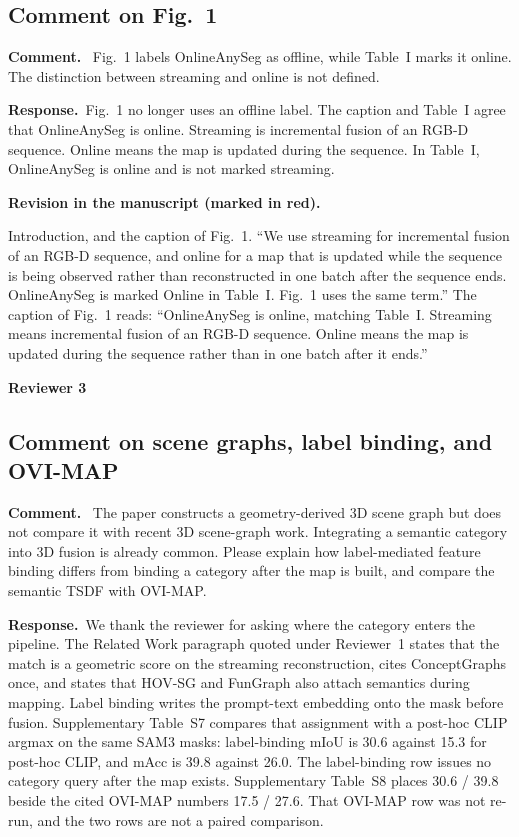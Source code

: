 \documentclass[11pt]{article}
\newcommand{\revcomment}[1]{%
  \par\vspace{0.6em}\noindent\textcolor{revblue}{\textbf{Comment.}}\ %
  \textcolor{revblue}{#1}\par\vspace{0.4em}}
\newcommand{\revresponse}[1]{%
  \par\noindent\textbf{Response.}\ #1\par\vspace{0.3em}}
\newcommand{\revchange}[1]{%
  \par\noindent\textbf{Revision in the manuscript (marked in red).}\par
  \noindent\textcolor{revred}{#1}\par\vspace{0.8em}}
\begin{document}
\subsection*{Comment on Fig.~1}

\revcomment{Fig.~1 labels OnlineAnySeg as offline, while Table~I marks it online. The distinction between streaming and online is not defined.}

\revresponse{Fig.~1 no longer uses an offline label. The caption and Table~I agree that OnlineAnySeg is online. Streaming is incremental fusion of an RGB-D sequence. Online means the map is updated during the sequence. In Table~I, OnlineAnySeg is online and is not marked streaming.}

\revchange{Introduction, and the caption of Fig.~1. ``We use streaming for incremental fusion of an RGB-D sequence, and online for a map that is updated while the sequence is being observed rather than reconstructed in one batch after the sequence ends. OnlineAnySeg is marked Online in Table~I. Fig.~1 uses the same term.'' The caption of Fig.~1 reads: ``OnlineAnySeg is online, matching Table~I. Streaming means incremental fusion of an RGB-D sequence. Online means the map is updated during the sequence rather than in one batch after it ends.''}

\bigskip
\noindent\textcolor{revblue}{\large\textbf{Reviewer 3}}

\subsection*{Comment on scene graphs, label binding, and OVI-MAP}

\revcomment{The paper constructs a geometry-derived 3D scene graph but does not compare it with recent 3D scene-graph work. Integrating a semantic category into 3D fusion is already common. Please explain how label-mediated feature binding differs from binding a category after the map is built, and compare the semantic TSDF with OVI-MAP.}

\revresponse{We thank the reviewer for asking where the category enters the pipeline. The Related Work paragraph quoted under Reviewer~1 states that the match is a geometric score on the streaming reconstruction, cites ConceptGraphs once, and states that HOV-SG and FunGraph also attach semantics during mapping. Label binding writes the prompt-text embedding onto the mask before fusion. Supplementary Table~S7 compares that assignment with a post-hoc CLIP argmax on the same SAM3 masks: label-binding mIoU is 30.6 against 15.3 for post-hoc CLIP, and mAcc is 39.8 against 26.0. The label-binding row issues no category query after the map exists. Supplementary Table~S8 places 30.6 / 39.8 beside the cited OVI-MAP numbers 17.5 / 27.6. That OVI-MAP row was not re-run, and the two rows are not a paired comparison.}
\end{document}
